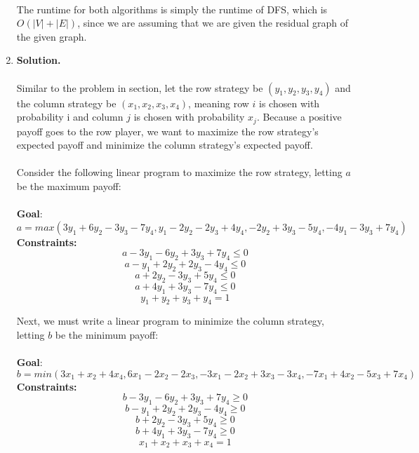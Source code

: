 \documentclass[11pt]{article}
\newcommand\solution{%
  \textbf{Solution.}\\%
}
\begin{document}
\begin{enumerate}
\\
The runtime for both algorithms is simply the runtime of DFS, which is $O(|V| + |E|)$, since we are assuming that we are given the residual graph of the given graph.


\item 

\solution \\
Similar to the problem in section, let the row strategy be $(y_1, y_2, y_3, y_4)$ and the column strategy be $(x_1, x_2, x_3, x_4)$, meaning row $i$ is chosen with probability i and column $j$ is chosen with probability $x_j$. Because a positive payoff goes to the row player, we want to maximize the row strategy's expected payoff and minimize the column strategy's expected payoff. \\
\\
Consider the following linear program to maximize the row strategy, letting $a$ be the maximum payoff: \\
\\
\textbf{Goal}:
\begin{equation*}
  a = max(3y_1 + 6y_2 - 3y_3 - 7y_4, y_1 - 2y_2 - 2y_3 + 4y_4, -2y_2 + 3y_3 - 5y_4, -4y_1 - 3y_3 + 7y_4)
\end{equation*}
\textbf{Constraints:}
\begin{equation*}
  a - 3y_1 - 6y_2 + 3y_3 + 7y_4 \leq 0
\end{equation*}
\begin{equation*}
  a -  y_1 + 2y_2 + 2y_3 - 4y_4 \leq 0
\end{equation*}
\begin{equation*}
  a + 2y_2 - 3y_3 + 5y_4 \leq 0
\end{equation*}
\begin{equation*}
  a + 4y_1 + 3y_3 - 7y_4 \leq 0
\end{equation*}
\begin{equation*}
  y_1 + y_2 + y_3 + y_4 = 1
\end{equation*}

Next, we must write a linear program to minimize the column strategy, letting $b$ be the minimum payoff: \\
\\
\textbf{Goal}:
\begin{equation*}
  b = min(3x_1 + x_2 + 4x_4, 6x_1 - 2x_2 - 2x_3, -3x_1 - 2x_2 + 3x_3 - 3x_4, -7x_1 + 4x_2 - 5x_3 + 7x_4)
\end{equation*}
\textbf{Constraints:}
\begin{equation*}
  b - 3y_1 - 6y_2 + 3y_3 + 7y_4 \geq 0
\end{equation*}
\begin{equation*}
  b -  y_1 + 2y_2 + 2y_3 - 4y_4 \geq 0
\end{equation*}
\begin{equation*}
  b + 2y_2 - 3y_3 + 5y_4 \geq 0
\end{equation*}
\begin{equation*}
  b + 4y_1 + 3y_3 - 7y_4 \geq 0
\end{equation*}
\begin{equation*}
  x_1 + x_2 + x_3 + x_4 = 1
\end{equation*}


\end{enumerate}
\end{document}
